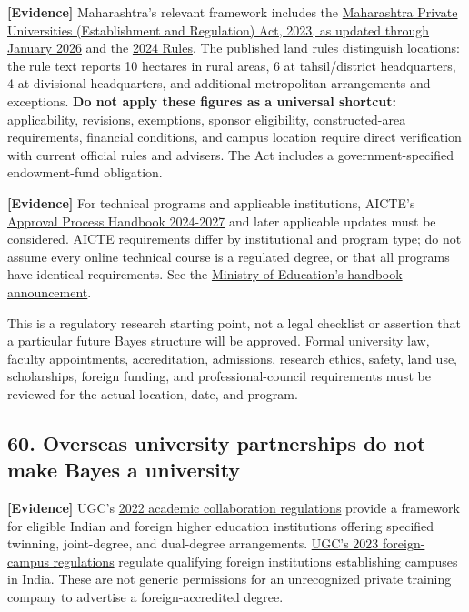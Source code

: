 \textbf{\textbf{[Evidence]}} Maharashtra's relevant framework includes the \href{https://lj.maharashtra.gov.in/\allowbreak en/document/\allowbreak the-maharashtra-private-universities-establishment-and-regulation-act-2023-text-as-on-13th-january-2026/}{Maharashtra Private Universities (Establishment and Regulation) Act, 2023, as updated through January 2026} and the \href{https://htedu.maharashtra.gov.in/\allowbreak Main/MaharashtraPrivateUniversitiesAct}{2024 Rules}. The published land rules distinguish locations: the rule text reports 10 hectares in rural areas, 6 at tahsil/\allowbreak district headquarters, 4 at divisional headquarters, and additional metropolitan arrangements and exceptions. \textbf{Do not apply these figures as a universal shortcut:} applicability, revisions, exemptions, sponsor eligibility, constructed-area requirements, financial conditions, and campus location require direct verification with current official rules and advisers. The Act includes a government-specified endowment-fund obligation.

\textbf{\textbf{[Evidence]}} For technical programs and applicable institutions, AICTE's \href{https://www.aicte.gov.in/\allowbreak sites/default/\allowbreak files/APH\%20Final.pdf}{Approval Process Handbook 2024-2027} and later applicable updates must be considered. AICTE requirements differ by institutional and program type; do not assume every online technical course is a regulated degree, or that all programs have identical requirements. See the \href{https://www.pib.gov.in/\allowbreak Pressreleaseshare.aspx?PRID=1983013\&lang=2\&reg=48}{Ministry of Education's handbook announcement}.

This is a regulatory research starting point, not a legal checklist or assertion that a particular future Bayes structure will be approved. Formal university law, faculty appointments, accreditation, admissions, research ethics, safety, land use, scholarships, foreign funding, and professional-council requirements must be reviewed for the actual location, date, and program.

\subsection{60. Overseas university partnerships do not make Bayes a university}

\textbf{\textbf{[Evidence]}} UGC's \href{https://www.ugc.gov.in/\allowbreak KeyInitiative?ID=\%2F1JT+8jW785lBIAsbqDMVw\%3D\%3D}{2022 academic collaboration regulations} provide a framework for eligible Indian and foreign higher education institutions offering specified twinning, joint-degree, and dual-degree arrangements. \href{https://www.ugc.gov.in/\allowbreak regulations}{UGC's 2023 foreign-campus regulations} regulate qualifying foreign institutions establishing campuses in India. These are not generic permissions for an unrecognized private training company to advertise a foreign-accredited degree.

